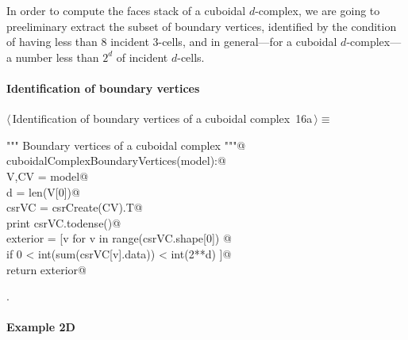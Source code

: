 \documentclass[11pt,oneside]{article}	%
\begin{document}
In order to compute the faces stack of a cuboidal $d$-complex, we are going to preeliminary extract the subset of boundary vertices, identified by the condition of having less than 8 incident 3-cells, and in general---for a cuboidal $d$-complex---a number less than $2^d$ of incident $d$-cells. 

\paragraph{Identification of boundary vertices}

\begin{flushleft} \small \label{scrap23}
\protect{}$\langle\,$Identification of boundary vertices of a cuboidal complex\nobreak\ {\footnotesize 16a}$\,\rangle\equiv$
\vspace{-1ex}
\begin{list}{}{} \item
\mbox{}\verb@""" Boundary vertices of a cuboidal complex """@\\
\mbox{}\verb@def cuboidalComplexBoundaryVertices(model):@\\
\mbox{}\verb@   V,CV = model@\\
\mbox{}\verb@   d = len(V[0])@\\
\mbox{}\verb@   csrVC = csrCreate(CV).T@\\
\mbox{}\verb@   print csrVC.todense()@\\
\mbox{}\verb@   exterior = [v for v in range(csrVC.shape[0]) @\\
\mbox{}\verb@            if 0 < int(sum(csrVC[v].data)) < int(2**d) ]@\\
\mbox{}\verb@   return exterior@\\
\mbox{}\verb@@{\NWsep}
\end{list}
\vspace{-1ex}
\footnotesize\addtolength{\baselineskip}{-1ex}
\begin{list}{}{\setlength{\itemsep}{-\parsep}\setlength{\itemindent}{-\leftmargin}}
\item {\NWtxtMacroNoRef}.
\end{list}
\end{flushleft}



\paragraph{Example 2D}
\end{document}
